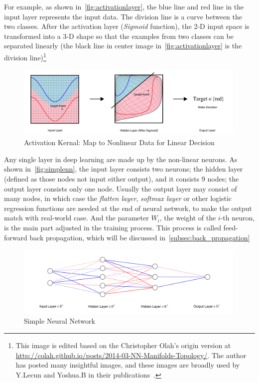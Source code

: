 \begin{spacing}{1.5}
For example, as shown in~\autoref{fig:activationlayer}, the blue line and red line in the input layer represents the input data. The division line is a curve between the two classes. After the activation layer (\textit{Sigmoid} function), the 2-D input space is transformed into a 3-D shape so that the examples from two classes can be separated linearly (the black line in center image in~\autoref{fig:activationlayer} is the division line)\footnote{This image is edited based on the Christopher Olah's origin version at  \url{http://colah.github.io/posts/2014-03-NN-Manifolds-Topology/}. The author has posted many insightful images, and these images are broadly used by Y.Lecun and Yoshua.B in their publications~\cite{bengio2017deep, lecun2015deep}.}


\begin{figure}[th]
\centering
\includegraphics[width=0.99\textwidth, fbox]{Chapter2/activation.pdf}
\caption{Activation Kernal: Map to Nonlinear Data for Linear Decision~\cite{olah2014neural}}
\label{fig:activationlayer} 
\end{figure}

Any single layer in deep learning are made up by the non-linear neurons. As shown in~\autoref{fig:simplenn}, the input layer consists two neurons; the hidden layer (defined as those nodes not input either output), and it consists 9 nodes; the output layer consists only one node. Usually the output layer may consist of many nodes, in which case the \textit{flatten layer}, \textit{softmax layer} or other logistic regression functions are needed at the end of neural network, to make the output match with real-world case. And the parameter $W_i$, the weight of the $i$-th neuron, is the main part adjusted in the training process. This process is called feed-forward back propagation, which will be discussed in~\autoref{subsec:back_propagation}

\begin{figure}[th]
\centering
\includegraphics[width=0.99\textwidth, fbox]{Chapter2/simplenn.pdf}
\caption{Simple Neural Network}
\label{fig:simplenn} 
\end{figure}


\end{spacing}
